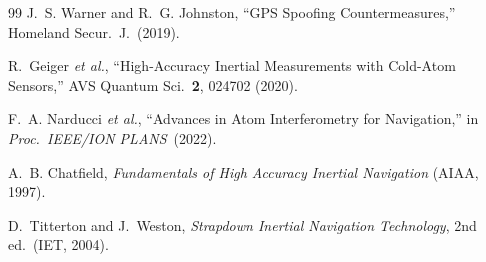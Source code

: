 \documentclass[twocolumn,superscriptaddress,prd,nofootinbib]{revtex4-2}
\begin{document}
\begin{thebibliography}{99}
J.~S. Warner and R.~G. Johnston, ``GPS Spoofing Countermeasures,''
Homeland Secur.\ J.\ (2019).

R.~Geiger \textit{et al.}, ``High-Accuracy Inertial Measurements with
Cold-Atom Sensors,'' AVS Quantum Sci.\ \textbf{2}, 024702 (2020).

F.~A. Narducci \textit{et al.}, ``Advances in Atom Interferometry for
Navigation,'' in \textit{Proc.\ IEEE/ION PLANS}\ (2022).

A.~B. Chatfield, \textit{Fundamentals of High Accuracy Inertial
Navigation} (AIAA, 1997).

D.~Titterton and J.~Weston, \textit{Strapdown Inertial Navigation
Technology}, 2nd ed.\ (IET, 2004).

\end{thebibliography}
\end{document}
